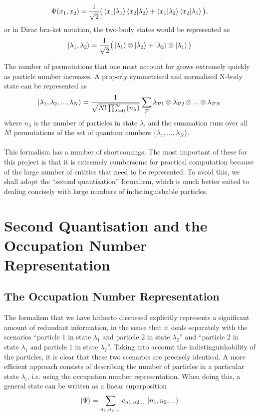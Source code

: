 \documentclass[a4paper,10pt]{article}
\begin{document}
\begin{equation}
 \Psi(x_1,x_2)=\frac{1}{\sqrt{2}}\big(\braket{x_1|\lambda_1}\braket{x_2|\lambda_2}+\braket{x_1|\lambda_2}\braket{x_2|\lambda_1}\big),
\end{equation}
or in Dirac bra-ket notation, the two-body states would be represented as
\begin{equation}
 \ket{\lambda_1,\lambda_2}=\frac{1}{\sqrt{2}}\big(\ket{\lambda_1}\otimes \ket{\lambda_2}+\ket{\lambda_2}\otimes\ket{\lambda_1}\big)
\end{equation}

The number of permutations that one must account for grows extremely quickly as particle number increases. A properly symmetrised and normalised N-body state can be
represented as 
\begin{equation}
 \ket{\lambda_1,\lambda_2,...,\lambda_N}=\frac{1}{\sqrt{N!\prod_{\lambda=0}^{\infty}{(n_{\lambda})}}}\sum_{\mathcal{P}}\lambda_{\mathcal{P}1}\otimes\lambda_{\mathcal{P}2}\otimes...\otimes\lambda_{\mathcal{P}N}
\end{equation}
where $n_{\lambda}$ is the number of particles in state $\lambda$, and the summation runs over all $N!$ permutations of the set of quantum numbers $\{ \lambda_1,\dots,\lambda_N\}$.
\\\\
This formalism has a number of shortcomings. The most important of these for this project is that it is extremely cumbersome for practical computation because of the large number of entities that need to be 
represented. To avoid this, we shall adopt the ``second quantisation'' formalism, which is much better suited to dealing concisely with large numbers of indistinguishable particles.

\section{Second Quantisation and the Occupation Number Representation}
\subsection{The Occupation Number Representation}
The formalism that we have hitherto discussed explicitly represents a significant amount of redundant information, in the sense that it deals separately with the scenarios ``particle 1 in state $\lambda_1$ and 
particle 2 in state $\lambda_2$'' and ``particle 2 in state $\lambda_1$ and particle 1 in state $\lambda_2$''. Taking into account the indistinguishability of the particles, it is clear that these two scenarios
are precisely identical. A more efficient approach consists of describing the number of particles in a particular state $\lambda_i$, i.e. using the occupation number representation. When doing this, a general 
state can be written as a linear superposition
\begin{equation}
 \ket{\Psi}=\sum_{n_1,n_2,...}c_{n1,n2,...}\ket{n_1,n_2,...}
\end{equation}
\end{document}
